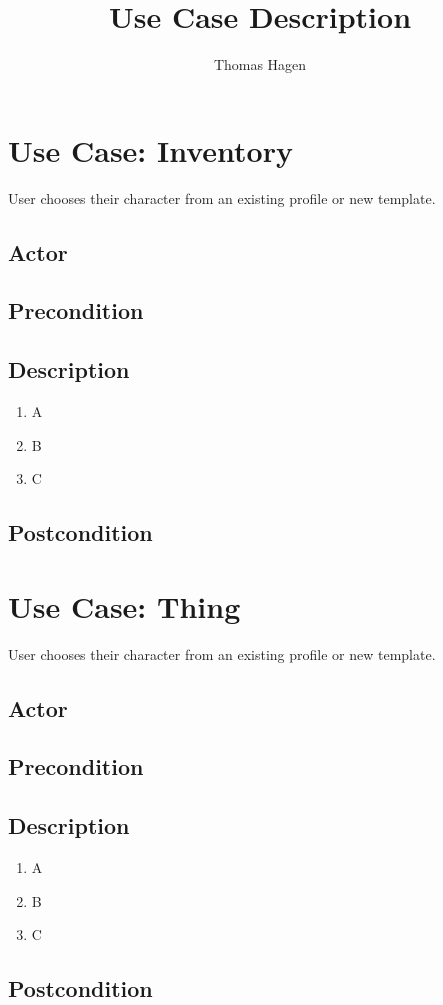 \documentclass[11pt]{article}
\title{Use Case Description}
\author{Thomas Hagen}
\begin{document}
    \maketitle


    \section{Use Case: Inventory}
	User chooses their character from an existing profile or new template.

		\subsection{Actor}

		\subsection{Precondition}
 
		\subsection{Description}
			\begin{enumerate}
			\item A
			\item B
			\item C
			\end{enumerate}

		\subsection{Postcondition}

    \section{Use Case: Thing}
	User chooses their character from an existing profile or new template.

		\subsection{Actor}

		\subsection{Precondition}
 
		\subsection{Description}
			\begin{enumerate}
			\item A
			\item B
			\item C
			\end{enumerate}

		\subsection{Postcondition}

    
\end{document}
